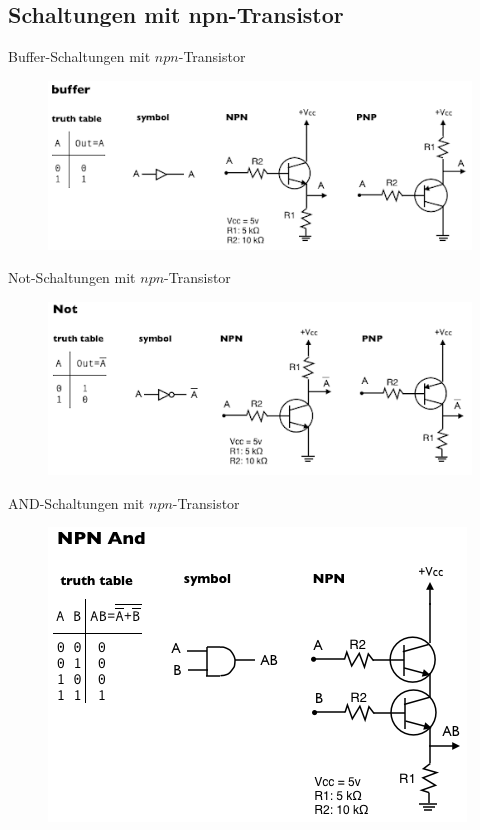 \documentclass[12pt%
,aspectratio=169%
]{beamer}
\begin{document}
\subsection{Schaltungen mit npn-Transistor}
\begin{frame}{Buffer-Schaltungen mit $npn$-Transistor}
\begin{figure}
\center
\includegraphics[scale=0.8]{pictures/buffer}
\end{figure}
\end{frame}


\begin{frame}{Not-Schaltungen mit $npn$-Transistor}
\begin{figure}
\center
\includegraphics[scale=0.8]{pictures/not}
\end{figure}
\end{frame}


\begin{frame}{AND-Schaltungen mit $npn$-Transistor}
\begin{figure}
\center
\includegraphics[scale=0.65]{pictures/and}
\end{figure}
\end{frame}
\end{document}
